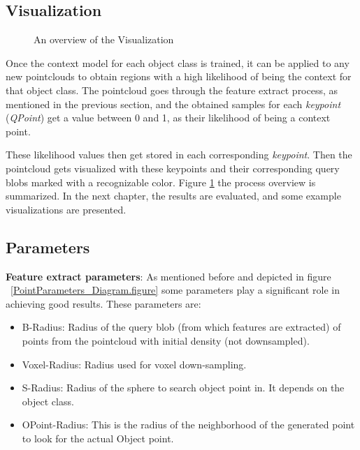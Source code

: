 \subsection{Visualization}
\label{visualization.ssec}

\begin{figure}[ht]
  \caption[Visualization overview]
  {An overview of the Visualization}
  \label{VisualizationFlowchart.figure}
\end{figure}

Once the context model for each object class is trained, it can be applied to any new pointclouds to obtain regions with a high likelihood of being the context for that object class. The pointcloud goes through the feature extract process, as mentioned in the previous section, and the obtained samples for each {\it keypoint} ({\it QPoint}) get a value between 0 and 1, as their likelihood of being a context point. 


These likelihood values then get stored in each corresponding {\it keypoint}. Then the pointcloud gets visualized with these keypoints and their corresponding query blobs marked with a recognizable color. Figure \ref{VisualizationFlowchart.figure} the process overview is summarized. 
In the next chapter, the results are evaluated, and some example visualizations are presented.


\subsection{Parameters}
\label{Parameters.ssec}

{\bf Feature extract parameters}:
As mentioned before and depicted in figure ~\ref{PointParameters_Diagram.figure} some parameters play a significant role in
achieving good results. 
These parameters are:

\begin{itemize}
 \item  B-Radius: Radius of the query blob (from which features are extracted) of points from the pointcloud with initial density (not downsampled).
 \item Voxel-Radius: Radius used for voxel down-sampling. 
 \item S-Radius: Radius of the sphere to search object point in. 
 It depends on the object class.
 \item OPoint-Radius: This is the radius of the neighborhood of the generated point to look for the actual Object point.
\end{itemize}

